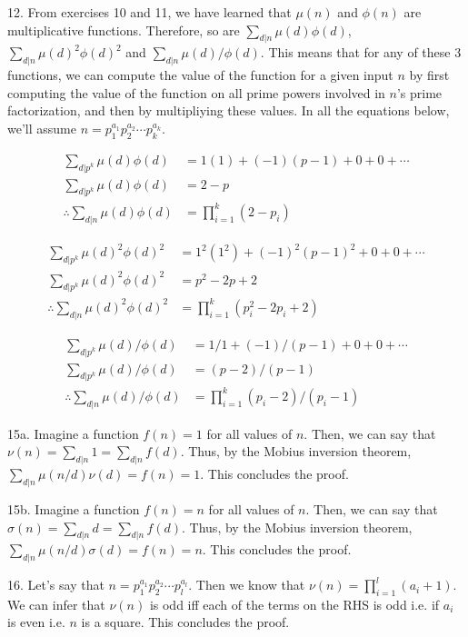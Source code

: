 \documentclass{article}
\begin{document}
12. From exercises 10 and 11, we have learned that $\mu(n)$ and $\phi(n)$ are multiplicative functions. Therefore, so are $\sum_{d | n} \mu(d) \phi(d)$, $\sum_{d | n} \mu(d)^2 \phi(d)^2$ and $\sum_{d | n} \mu(d) / \phi(d)$. This means that for any of these 3 functions, we can compute the value of the function for a given input $n$ by first computing the value of the function on all prime powers involved in $n$'s prime factorization, and then by multipliying these values. In all the equations below, we'll assume $n = p_1^{a_1} p_2^{a_2} \cdots p_k^{a_k}$.

\begin{align*}
    \sum_{d | p^k} \mu(d) \phi(d) &=  1(1) + (-1)(p - 1) + 0 + 0 + \cdots \\
    \sum_{d | p^k} \mu(d) \phi(d) &=  2 - p \\
    \therefore \sum_{d | n} \mu(d) \phi(d) &= \prod_{i = 1}^k (2 - p_i)
\end{align*}

\begin{align*}
    \sum_{d | p^k} \mu(d)^2 \phi(d)^2 &=  1^2(1^2) + (-1)^2(p - 1)^2 + 0 + 0 + \cdots \\
    \sum_{d | p^k} \mu(d)^2 \phi(d)^2 &=  p^2 - 2p + 2 \\
    \therefore \sum_{d | n} \mu(d)^2 \phi(d)^2 &= \prod_{i = 1}^k (p_i^2 -2p_i + 2)
\end{align*}

\begin{align*}
    \sum_{d | p^k} \mu(d) / \phi(d) &=  1 / 1 + (-1) / (p - 1) + 0 + 0 + \cdots \\
    \sum_{d | p^k} \mu(d) / \phi(d) &=  (p - 2) / (p - 1) \\
    \therefore \sum_{d | n} \mu(d) / \phi(d) &= \prod_{i = 1}^k (p_i - 2) / (p_i - 1)
\end{align*}

15a. Imagine a function $f(n) = 1$ for all values of $n$. Then, we can say that $\nu(n) = \sum_{d | n} 1 = \sum_{d | n} f(d)$. Thus, by the Mobius inversion theorem, $\sum_{d | n} \mu(n/d)\nu(d) = f(n) = 1$. This concludes the proof. 

15b. Imagine a function $f(n) = n$ for all values of $n$. Then, we can say that $\sigma(n) = \sum_{d | n} d = \sum_{d | n} f(d)$. Thus, by the Mobius inversion theorem, $\sum_{d | n} \mu(n/d)\sigma(d) = f(n) = n$. This concludes the proof.

16. Let's say that $n = p_1^{a_1} p_2^{a_2} \cdots p_l^{a_l}$. Then we know that $\nu(n) = \prod_{i = 1}^l (a_i + 1)$. We can infer that $\nu(n)$ is odd iff each of the terms on the RHS is odd i.e. if $a_i$ is even i.e. $n$ is a square. This concludes the proof.
\end{document}
